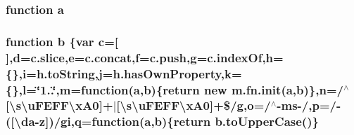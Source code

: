\subsubsection[{a}]{\setlength{\rightskip}{0pt plus 5cm}function a}\label{application_2assets_2js_2jquery-1_811_82_8min_8js_aa4d4888597588a84fd5b1184d00c91f3}
\hypertarget{application_2assets_2js_2jquery-1_811_82_8min_8js_ac0431efac4d7c393d1e70b86115cb93f}{}
\subsubsection[{b}]{\setlength{\rightskip}{0pt plus 5cm}function b \{var {\bf c}=\mbox{[}$\,$\mbox{]},{\bf d}=c.\+slice,{\bf e}=c.\+concat,f=c.\+push,g=c.\+index\+Of,h=\{\},i=h.\+to\+String,j=h.\+has\+Own\+Property,k=\{\},l=\char`\"{}1..\char`\"{},m=function({\bf a},b)\{return new m.\+fn.\+init({\bf a},b)\},{\bf n}=/$^\wedge$\mbox{[}\textbackslash{}s\textbackslash{}u\+F\+E\+F\+F\textbackslash{}x\+A0\mbox{]}+$\vert$\mbox{[}\textbackslash{}s\textbackslash{}u\+F\+E\+F\+F\textbackslash{}x\+A0\mbox{]}+\$/g,o=/$^\wedge$-\/ms-\//,p=/-\/(\mbox{[}\textbackslash{}da-\/z\mbox{]})/gi,q=function({\bf a},b)\{return b.\+to\+Upper\+Case()\}}\label{application_2assets_2js_2jquery-1_811_82_8min_8js_ac0431efac4d7c393d1e70b86115cb93f}
\hypertarget{application_2assets_2js_2jquery-1_811_82_8min_8js_a167947be5252c14d5389d8a01a8c8545}{}

